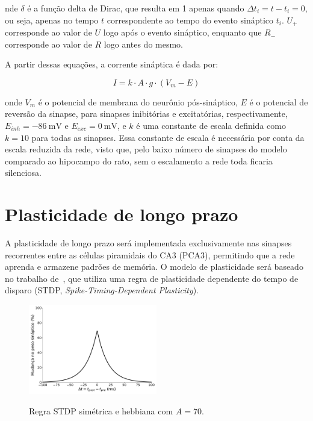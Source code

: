 nde $\delta$ é a função delta de Dirac, que resulta em 1 apenas quando $\Delta t_i = t - t_i = 0$, ou seja, apenas no tempo $t$
correspondente ao tempo do evento sináptico $t_i$. $U_{+}$ corresponde ao valor de $U$ logo após o evento sináptico, enquanto que
$R_{-}$ corresponde ao valor de $R$ logo antes do mesmo.

A partir dessas equações, a corrente sináptica é dada por:

\begin{equation}
    \label{eq_tsodyks_I}
    I = k \cdot A \cdot g \cdot (V_m - E)
\end{equation}

onde $V_m$ é o potencial de membrana do neurônio pós-sináptico, $E$ é o potencial de reversão da sinapse, para sinapses
inibitórias e excitatórias, respectivamente, $E_{inh} = \SI{-86}{\milli\volt}$ e $E_{exc} = \SI{0}{\milli\volt}$, e $k$
é uma constante de escala definida como $k = 10$ para todas as sinapses. Essa constante de escala é necessária por conta
da escala reduzida da rede, visto que, pelo baixo número de sinapses do modelo comparado ao hipocampo do rato, sem o 
escalamento a rede toda ficaria silenciosa.





\section{Plasticidade de longo prazo}

A plasticidade de longo prazo será implementada exclusivamente nas sinapses recorrentes entre as células piramidais do CA3 (PCA3),
permitindo que a rede aprenda e armazene padrões de memória. O modelo de plasticidade será baseado no trabalho
de~, que utiliza uma regra de plasticidade dependente do tempo de disparo (STDP,
\textit{Spike-Timing-Dependent Plasticity}).

\begin{figure}[H]
    \centering
    \caption{Regra STDP simétrica e hebbiana com $A = 70$.}
    \includegraphics[width=0.5\textwidth]{figuras/symmetric_stdp}
    \label{fig:symmetric_stdp}
\end{figure}

